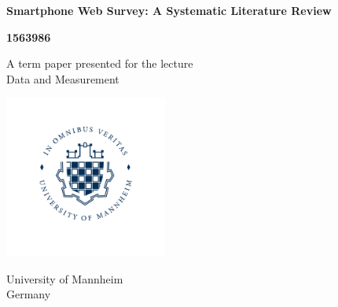 \documentclass[12pt,a4paper]{article}
\begin{document}
\begin{titlepage}
   \begin{center}
   
       \vspace*{1cm}
       
       \large
       \textbf{Smartphone Web Survey: A Systematic Literature Review}
        
       \vspace{1.5cm}
   
       \textbf{1563986}
   
       \vfill
   
       A term paper presented for the lecture\\
       Data and Measurement
   
       \vspace{0.8cm}
   
       \includegraphics[width=0.4\textwidth]{reports/figures/08_UM_SIGNET_EN_RGB.png}
       
       University of Mannheim\\
       Germany\\
   
       \date{\today}
   
   \end{center}
\end{titlepage}
\end{document}
